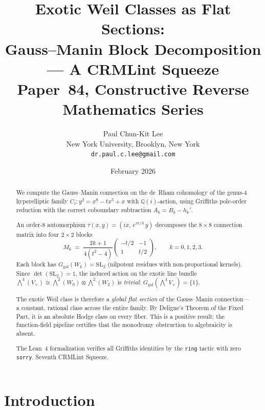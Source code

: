 \documentclass[11pt]{article}
\theoremstyle{plain}
\theoremstyle{definition}
\theoremstyle{remark}
\newcommand{\Q}{\mathbb{Q}}
\newcommand{\SL}{\mathrm{SL}}
\newcommand{\Ggal}{G_{\mathrm{gal}}}
\begin{document}
\title{Exotic Weil Classes as Flat Sections:\\
Gauss--Manin Block Decomposition --- A CRMLint Squeeze\\[6pt]
\large Paper~84, Constructive Reverse Mathematics Series}

\author{Paul Chun-Kit Lee\\
\small New York University, Brooklyn, New York\\
\small \texttt{dr.paul.c.lee@gmail.com}}

\date{February 2026}

\maketitle

\begin{abstract}
We compute the Gauss--Manin connection on the de~Rham cohomology of the
genus-4 hyperelliptic family $C_t\colon y^2 = x^9 - tx^5 + x$ with
$\Q(i)$-action, using Griffiths pole-order reduction with the correct
coboundary subtraction $A_k = B_k - h_k'$.

An order-8 automorphism $\tau(x,y) = (ix,\, e^{\pi i/4}\,y)$ decomposes
the $8 \times 8$ connection matrix into four $2 \times 2$ blocks
\[
  M_k \;=\; \frac{2k+1}{4(t^2-4)}
  \begin{pmatrix} -t/2 & -1 \\ 1 & t/2 \end{pmatrix},
  \qquad k = 0,1,2,3.
\]
Each block has $\Ggal(W_k) = \SL_2$ (nilpotent residues with
non-proportional kernels). Since $\det(\SL_2) = 1$, the induced action
on the exotic line bundle $\bigwedge^4(V_+) \cong \bigwedge^2(W_0) \otimes
\bigwedge^2(W_2)$ is \emph{trivial}: $\Ggal(\bigwedge^4 V_+) = \{1\}$.

The exotic Weil class is therefore a \emph{global flat section} of the
Gauss--Manin connection---a constant, rational class across the entire
family. By Deligne's Theorem of the Fixed Part, it is an absolute
Hodge class on every fiber. This is a positive result: the function-field
pipeline certifies that the monodromy obstruction to algebraicity is
absent.

The Lean~4 formalization verifies all Griffiths identities by the
\texttt{ring} tactic with zero \texttt{sorry}.
Seventh CRMLint Squeeze.
\end{abstract}

\section{Introduction}
\end{document}
